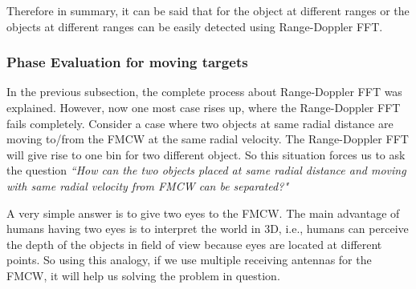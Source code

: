 Therefore in summary, it can be said that for the object at different ranges or the objects at different ranges can be easily detected using Range-Doppler FFT.

\subsubsection*{Phase Evaluation for moving targets}

In the previous subsection, the complete process about Range-Doppler FFT was explained. However, now one most case rises up, where the Range-Doppler FFT fails completely. Consider a case where two objects at same radial distance are moving to/from the FMCW at the same radial velocity. The Range-Doppler FFT will give rise to one bin for two different object. So this situation forces us to ask the question
\textit{``How can the two objects placed at same radial distance and moving with same radial velocity from FMCW can be  separated?"}

A very simple answer is to give two eyes to the FMCW. The main advantage of humans having two eyes is to interpret the world in 3D, i.e., humans can perceive the depth of the objects in field of view because eyes are located at different points. So using this analogy, if we use multiple receiving antennas for the FMCW, it will help us solving the problem in question.

